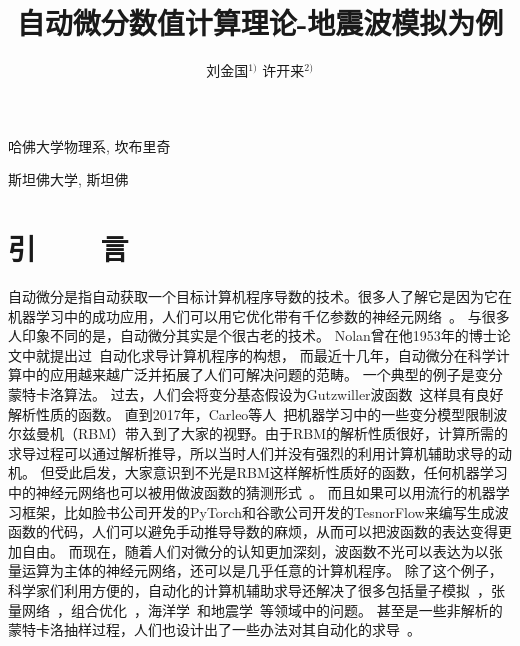 \documentclass[A4,twoside,fontset=ubuntu,UTF8]{ctexart}
\begin{document}
\apsname

\title{自动微分数值计算理论-地震波模拟为例 \fivestar}%

\author{刘金国$^{1)}$ \quad 许开来$^{2)}$}

\address{1)}{哈佛大学物理系, 坎布里奇 }
\address{2)}{斯坦佛大学, 斯坦佛 }





\cfund{}




{}\baselineskip
\section{引~~~~言}
    自动微分是指自动获取一个目标计算机程序导数的技术。很多人了解它是因为它在机器学习中的成功应用，人们可以用它优化带有千亿参数的神经元网络~\cite{Rosset2019}。
与很多人印象不同的是，自动微分其实是个很古老的技术。
Nolan曾在他1953年的博士论文中就提出过~\cite{Nolan1953}自动化求导计算机程序的构想，
而最近十几年，自动微分在科学计算中的应用越来越广泛并拓展了人们可解决问题的范畴。
    一个典型的例子是变分蒙特卡洛算法。
过去，人们会将变分基态假设为Gutzwiller波函数~\cite{Gutzwiller1963}这样具有良好解析性质的函数。
直到2017年，Carleo等人~\cite{Carleo2017, Deng2017}把机器学习中的一些变分模型限制波尔兹曼机（RBM）带入到了大家的视野。由于RBM的解析性质很好，计算所需的求导过程可以通过解析推导，所以当时人们并没有强烈的利用计算机辅助求导的动机。
但受此启发，大家意识到不光是RBM这样解析性质好的函数，任何机器学习中的神经元网络也可以被用做波函数的猜测形式~\cite{Cai2018}。
而且如果可以用流行的机器学习框架，比如脸书公司开发的PyTorch和谷歌公司开发的TesnorFlow来编写生成波函数的代码，人们可以避免手动推导导数的麻烦，从而可以把波函数的表达变得更加自由。
而现在，随着人们对微分的认知更加深刻，波函数不光可以表达为以张量运算为主体的神经元网络，还可以是几乎任意的计算机程序。
    除了这个例子，科学家们利用方便的，自动化的计算机辅助求导还解决了很多包括量子模拟~\cite{Luo2019}，张量网络~\cite{Liao2019}，组合优化~\cite{Liu2020}，海洋学~\cite{Heimbach2005}和地震学~\cite{Symes2007,Zhu2020}等领域中的问题。
甚至是一些非解析的蒙特卡洛抽样过程，人们也设计出了一些办法对其自动化的求导~\cite{Zhang2019}。
\end{document}
